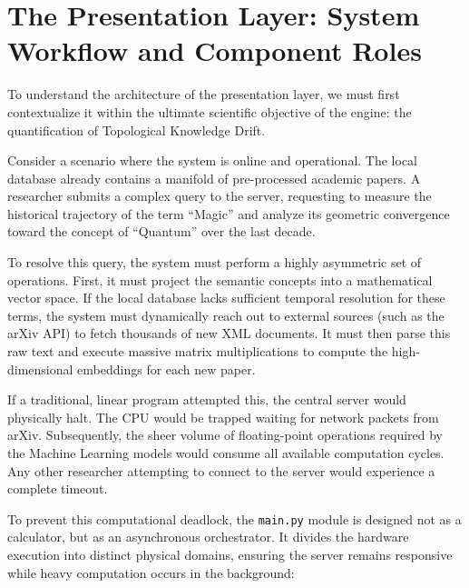 \section{The Presentation Layer: System Workflow and Component Roles}

To understand the architecture of the presentation layer, we must first contextualize it within the ultimate scientific objective of the engine: the quantification of Topological Knowledge Drift.

Consider a scenario where the system is online and operational. The local database already contains a manifold of pre-processed academic papers. A researcher submits a complex query to the server, requesting to measure the historical trajectory of the term ``Magic'' and analyze its geometric convergence toward the concept of ``Quantum'' over the last decade.

To resolve this query, the system must perform a highly asymmetric set of operations. First, it must project the semantic concepts into a mathematical vector space. If the local database lacks sufficient temporal resolution for these terms, the system must dynamically reach out to external sources (such as the arXiv API) to fetch thousands of new XML documents. It must then parse this raw text and execute massive matrix multiplications to compute the high-dimensional embeddings for each new paper.

If a traditional, linear program attempted this, the central server would physically halt. The CPU would be trapped waiting for network packets from arXiv. Subsequently, the sheer volume of floating-point operations required by the Machine Learning models would consume all available computation cycles. Any other researcher attempting to connect to the server would experience a complete timeout.

To prevent this computational deadlock, the \texttt{main.py} module is designed not as a calculator, but as an asynchronous orchestrator. It divides the hardware execution into distinct physical domains, ensuring the server remains responsive while heavy computation occurs in the background:

